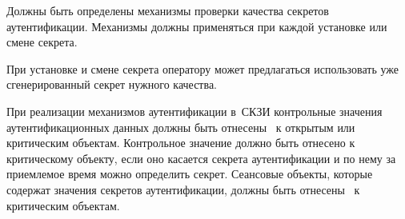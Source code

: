 \label{R.IA.PwdSet} %
Должны быть определены механизмы проверки качества 
секретов аутентификации. Механизмы должны применяться при каждой 
установке или смене секрета.

\begin{note}
При установке и смене секрета оператору может предлагаться использовать
уже сгенерированный секрет нужного качества.
\end{note}

\label{R.IA.AuthProtect} %
При реализации механизмов аутентификации в~СКЗИ контрольные значения
аутентификационных данных должны быть отнесены~ к открытым
или критическим объектам.
%
Контрольное значение должно быть отнесено к критическому объекту, 
если оно касается секрета аутентификации и по нему за приемлемое
время можно определить секрет.
%
Сеансовые объекты, которые содержат значения секретов аутентификации,
должны быть отнесены~ к критическим объектам.

